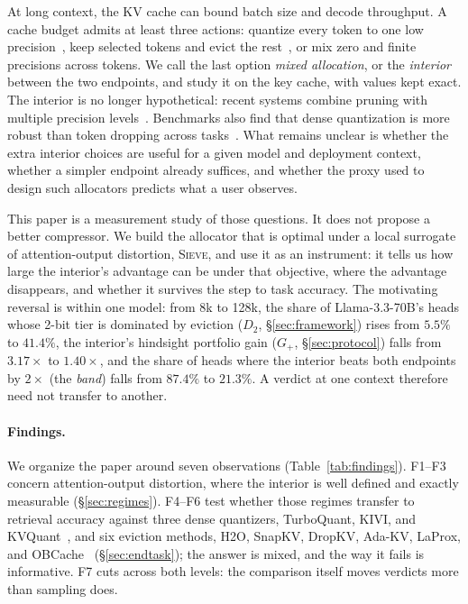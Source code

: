 \documentclass{article}
\newcommand{\sieve}{\textsc{Sieve}}
\newcommand{\gplus}{G_{+}}
\theoremstyle{definition}
\begin{document}
At long context, the KV cache can bound batch size and decode throughput.  A cache budget admits at least three actions: quantize every token to one low precision~\citep{liu2024kivi,hooper2024kvquant,zandieh2025turboquant}, keep selected tokens and evict the rest~\citep{zhang2023h2o,liu2023scissorhands,li2024snapkv,xiao2024streamingllm}, or mix zero and finite precisions across tokens.  We call the last option \emph{mixed allocation}, or the \emph{interior} between the two endpoints, and study it on the key cache, with values kept exact.  The interior is no longer hypothetical: recent systems combine pruning with multiple precision levels~\citep{zhang2025diffkv,wang-etal-2026-hqekv}.  Benchmarks also find that dense quantization is more robust than token dropping across tasks~\citep{yuan2024kvbench}.  What remains unclear is whether the extra interior choices are useful for a given model and deployment context, whether a simpler endpoint already suffices, and whether the proxy used to design such allocators predicts what a user observes.

This paper is a measurement study of those questions.  It does not propose a better compressor.  We build the allocator that is optimal under a local surrogate of attention-output distortion, \sieve{}, and use it as an instrument: it tells us how large the interior's advantage can be under that objective, where the advantage disappears, and whether it survives the step to task accuracy.  The motivating reversal is within one model: from 8k to 128k, the share of Llama-3.3-70B's heads whose 2-bit tier is dominated by eviction ($D_2$, \S\ref{sec:framework}) rises from $5.5\%$ to $41.4\%$, the interior's hindsight portfolio gain ($\gplus$, \S\ref{sec:protocol}) falls from $3.17\times$ to $1.40\times$, and the share of heads where the interior beats both endpoints by $2\times$ (the \emph{band}) falls from $87.4\%$ to $21.3\%$.  A verdict at one context therefore need not transfer to another.

\paragraph{Findings.}  We organize the paper around seven observations (Table~\ref{tab:findings}).  F1--F3 concern attention-output distortion, where the interior is well defined and exactly measurable (\S\ref{sec:regimes}).  F4--F6 test whether those regimes transfer to retrieval accuracy against three dense quantizers, TurboQuant, KIVI, and KVQuant~\citep{zandieh2025turboquant,liu2024kivi,hooper2024kvquant}, and six eviction methods, H2O, SnapKV, DropKV, Ada-KV, LaProx, and OBCache~\citep{zhang2023h2o,li2024snapkv,zhang2026dropkv,feng2024adakv,mai2026laprox,gu2026obcache} (\S\ref{sec:endtask}); the answer is mixed, and the way it fails is informative.  F7 cuts across both levels: the comparison itself moves verdicts more than sampling does.
\end{document}
